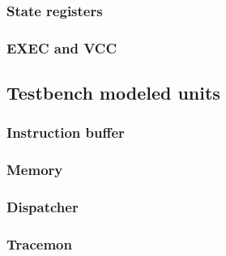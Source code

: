 \documentclass{article}
\begin{document}
\subsubsection{State registers}
\subsubsection{EXEC and VCC}
\subsection{Testbench modeled units}
\subsubsection{Instruction buffer}
\subsubsection{Memory}
\subsubsection{Dispatcher}
\subsubsection{Tracemon}
\end{document}
